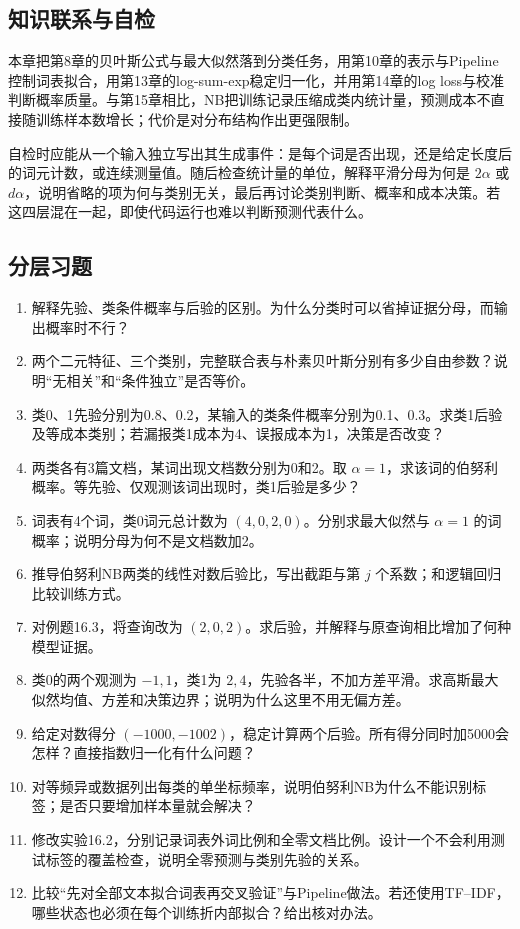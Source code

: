 \documentclass[UTF8,fontset=none,zihao=-4,a4paper]{ctexart}
\numberwithin{equation}{section}
\numberwithin{figure}{section}
\begin{document}
\subsection{知识联系与自检}
本章把第8章的贝叶斯公式与最大似然落到分类任务，用第10章的表示与Pipeline控制词表拟合，用第13章的log-sum-exp稳定归一化，并用第14章的log loss与校准判断概率质量。与第15章相比，NB把训练记录压缩成类内统计量，预测成本不直接随训练样本数增长；代价是对分布结构作出更强限制。

自检时应能从一个输入独立写出其生成事件：是每个词是否出现，还是给定长度后的词元计数，或连续测量值。随后检查统计量的单位，解释平滑分母为何是 $2\alpha$ 或 $d\alpha$，说明省略的项为何与类别无关，最后再讨论类别判断、概率和成本决策。若这四层混在一起，即使代码运行也难以判断预测代表什么。

\subsection{分层习题}
\begin{enumerate}[label=16.\arabic*]
\item 解释先验、类条件概率与后验的区别。为什么分类时可以省掉证据分母，而输出概率时不行？
\item 两个二元特征、三个类别，完整联合表与朴素贝叶斯分别有多少自由参数？说明“无相关”和“条件独立”是否等价。
\item 类0、1先验分别为0.8、0.2，某输入的类条件概率分别为0.1、0.3。求类1后验及等成本类别；若漏报类1成本为4、误报成本为1，决策是否改变？
\item 两类各有3篇文档，某词出现文档数分别为0和2。取 $\alpha=1$，求该词的伯努利概率。等先验、仅观测该词出现时，类1后验是多少？
\item 词表有4个词，类0词元总计数为 $(4,0,2,0)$。分别求最大似然与 $\alpha=1$ 的词概率；说明分母为何不是文档数加2。
\item 推导伯努利NB两类的线性对数后验比，写出截距与第 $j$ 个系数；和逻辑回归比较训练方式。
\item 对例题16.3，将查询改为 $(2,0,2)$。求后验，并解释与原查询相比增加了何种模型证据。
\item 类0的两个观测为 $-1,1$，类1为 $2,4$，先验各半，不加方差平滑。求高斯最大似然均值、方差和决策边界；说明为什么这里不用无偏方差。
\item 给定对数得分 $(-1000,-1002)$，稳定计算两个后验。所有得分同时加5000会怎样？直接指数归一化有什么问题？
\item 对等频异或数据列出每类的单坐标频率，说明伯努利NB为什么不能识别标签；是否只要增加样本量就会解决？
\item 修改实验16.2，分别记录词表外词比例和全零文档比例。设计一个不会利用测试标签的覆盖检查，说明全零预测与类别先验的关系。
\item 比较“先对全部文本拟合词表再交叉验证”与Pipeline做法。若还使用TF--IDF，哪些状态也必须在每个训练折内部拟合？给出核对办法。
\end{enumerate}
\end{document}
